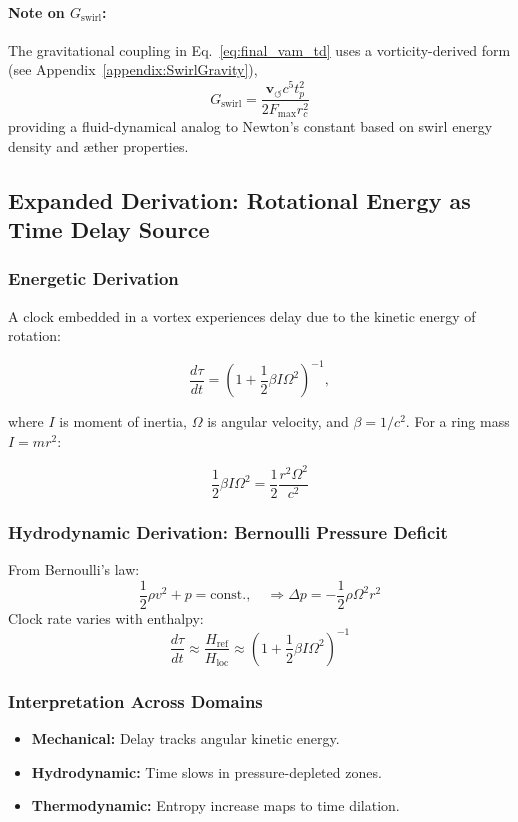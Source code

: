 \paragraph{Note on $G_\text{swirl}$:}
The gravitational coupling in Eq.~\eqref{eq:final_vam_td} uses a vorticity-derived form (see Appendix~\ref{appendix:SwirlGravity}),
\[
    G_\text{swirl} = \frac{\mathbf{v}_{\scriptscriptstyle\boldsymbol{\circlearrowleft}} c^5 t_p^2}{2 F_{\text{max}} r_c^2}
\]
providing a fluid-dynamical analog to Newton's constant based on swirl energy density and æther properties.


\subsection{Expanded Derivation: Rotational Energy as Time Delay Source}

\subsubsection{Energetic Derivation}

A clock embedded in a vortex experiences delay due to the kinetic energy of rotation:

\begin{equation}
    \frac{d\tau}{dt} = \left(1 + \frac{1}{2} \beta I \Omega^2 \right)^{-1},
\end{equation}

where $I$ is moment of inertia, $\Omega$ is angular velocity, and $\beta = 1/c^2$. For a ring mass $I = m r^2$:

\[
    \frac{1}{2} \beta I \Omega^2 = \frac{1}{2} \frac{r^2 \Omega^2}{c^2}
\]

\subsubsection{Hydrodynamic Derivation: Bernoulli Pressure Deficit}

From Bernoulli's law:
\[
    \frac{1}{2} \rho v^2 + p = \text{const.}, \quad \Rightarrow \Delta p = -\frac{1}{2} \rho \Omega^2 r^2
\]
Clock rate varies with enthalpy:
\[
    \frac{d\tau}{dt} \approx \frac{H_\text{ref}}{H_\text{loc}} \approx \left(1 + \frac{1}{2} \beta I \Omega^2 \right)^{-1}
\]

\subsubsection{Interpretation Across Domains}
\begin{itemize}
    \item \textbf{Mechanical:} Delay tracks angular kinetic energy.
    \item \textbf{Hydrodynamic:} Time slows in pressure-depleted zones.
    \item \textbf{Thermodynamic:} Entropy increase maps to time dilation.
\end{itemize}

